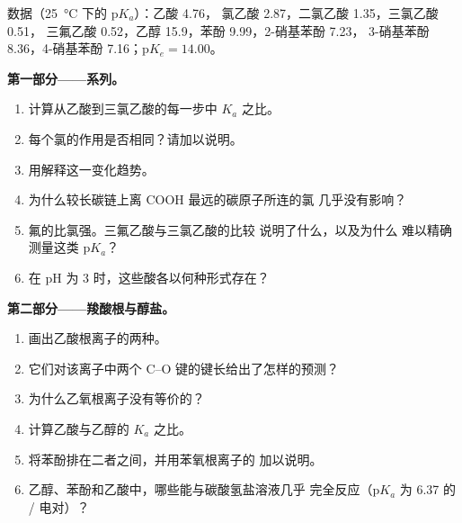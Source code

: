 \begin{problem}
\label{pb:b1:electronic-effects:1}
数据（\qty{25}{\celsius} 下的 $\mathrm{p}K_a$）：乙酸 4.76，
氯乙酸 2.87，二氯乙酸 1.35，三氯乙酸 0.51，
三氟乙酸 0.52，乙醇 15.9，苯酚 9.99，2-硝基苯酚 7.23，
3-硝基苯酚 8.36，4-硝基苯酚 7.16；$\mathrm{p}K_e = 14.00$。

\medskip
\noindent\textbf{第一部分——系列。}
\begin{enumerate}
  \item 计算从乙酸到三氯乙酸的每一步中
        $K_a$ 之比。
  \item 每个氯的作用是否相同？请加以说明。
  \item 用解释这一变化趋势。
  \item 为什么较长碳链上离 COOH 最远的碳原子所连的氯
        几乎没有影响？
  \item 氟的比氯强。三氟乙酸与三氯乙酸的比较
        说明了什么，以及为什么
        难以精确测量这类 $\mathrm{p}K_a$？
  \item 在 pH 为 3 时，这些酸各以何种形式存在？
\end{enumerate}

\medskip
\noindent\textbf{第二部分——羧酸根与醇盐。}
\begin{enumerate}[resume]
  \item 画出乙酸根离子的两种。
  \item 它们对该离子中两个 C--O 键的键长给出了怎样的预测？
  \item 为什么乙氧根离子没有等价的？
  \item 计算乙酸与乙醇的 $K_a$ 之比。
  \item 将苯酚排在二者之间，并用苯氧根离子的
        加以说明。
  \item 乙醇、苯酚和乙酸中，哪些能与碳酸氢盐溶液几乎
        完全反应（$\mathrm{p}K_a$ 为 6.37 的
        / 电对）？
\end{enumerate}


\end{problem}
